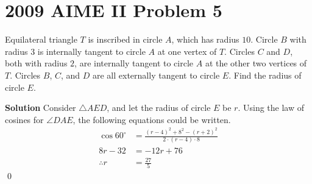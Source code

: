 \documentclass{article}
\newenvironment{solution}{\begin{trivlist}\item[]{\bf Solution}}{\qed \end{trivlist}}
\begin{document}
\section*{2009 AIME II Problem 5}
Equilateral triangle $T$ is inscribed in circle $A$, which has radius $10$. Circle $B$ with radius $3$ is internally tangent to circle $A$ at one vertex of $T$. Circles $C$ and $D$, both with radius $2$, are internally tangent to circle $A$ at the other two vertices of $T$. Circles $B$, $C$, and $D$ are all externally tangent to circle $E$. Find the radius of circle $E$.
\begin{center}
\end{center}
\begin{solution}
Consider $\triangle{AED}$, and let the radius of circle $E$ be $r$. Using the law of cosines for $\angle{DAE}$, the following equations could be written.
\begin{align*}
    \cos60^\circ &= \frac{(r - 4)^2 + 8^2 - (r + 2)^2}{2 \cdot (r - 4) \cdot 8} \\
    8r - 32 &= -12r + 76 \\
    \therefore r&= \boxed{\frac{27}{5}}
\end{align*}
\end{solution}
\end{document}
